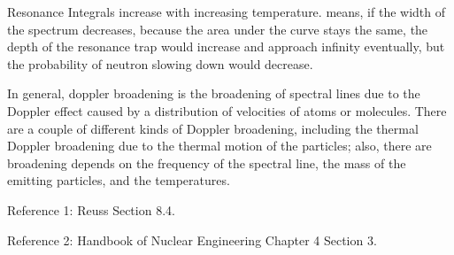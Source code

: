 \documentclass{school-22.211-notes}
\begin{document}
Resonance Integrals increase with increasing temperature.  means, if the width of the spectrum decreases, because the area under the curve stays the same, the depth of the resonance trap would increase and approach infinity eventually, but the probability of neutron slowing down would decrease. 

In general, doppler broadening is the broadening of spectral lines due to the Doppler effect caused by a distribution of velocities of atoms or molecules. There are a couple of different kinds of Doppler broadening, including the thermal Doppler broadening due to the thermal motion of the particles; also, there are broadening depends on the frequency of the spectral line, the mass of the emitting particles, and the temperatures. 

Reference 1: Reuss Section 8.4. 

Reference 2: Handbook of Nuclear Engineering Chapter 4 Section 3. 
\end{document}
